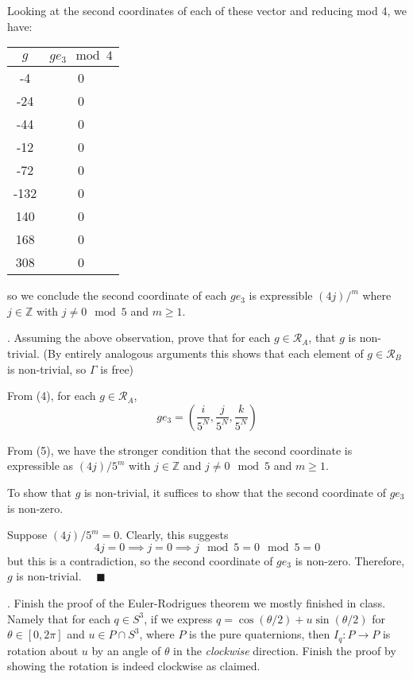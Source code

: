 \documentclass[12pt]{article}
\newcommand{\Z}{\mathbb{Z}}
\newcommand{\lra}{\longrightarrow}
\newcommand{\qed}{\quad \blacksquare}
\begin{document}
        Looking at the second coordinates of each of these vector and reducing mod 4, we have:
        \begin{center}
            \begin{tabular}{|c|c|}
                \hline 
                $g$ & $g e_3 \mod 4$\\
                \hline
                -4 & 0\\ 
                -24 & 0\\ 
                -44 & 0\\
                -12 & 0\\
                -72 & 0\\
                -132 & 0\\
                140 & 0\\
                168 & 0\\
                308 & 0\\ 
                \hline
            \end{tabular}
        \end{center}
        so we conclude the second coordinate of each $ge_3$ is expressible $(4j)/^m$ where $j \in \Z$ with $j \neq 0 \mod 5$ and $m \geq 1$.

    \color{black}


.  Assuming the above observation, prove that for each $g \in \mathcal{R}_{A}$, that $g$ is non-trivial.  (By entirely analogous arguments this shows that each element of $g \in \mathcal{R}_{B}$ is non-trivial, so $\Gamma$ is free)

    \color{blue}
        From (4), for each $g \in \mathcal{R}_A$, 
        \[ge_3 = \left(\frac{i}{5^N}, \frac{j}{5^N}, \frac{k}{5^N}\right)\]

        From (5), we have the stronger condition that the second coordinate is expressible as $(4j)/5^m$ with $j \in \Z$ and $j \neq 0 \mod 5$ and $m \geq 1$.

        To show that $g$ is non-trivial, it suffices to show that the second coordinate of $ge_3$ is non-zero.

        Suppose $(4j)/5^m = 0$. Clearly, this suggests 
        \[4j = 0 \implies j = 0 \implies j \mod 5 = 0 \mod 5 = 0\] 
        but this is a contradiction, so the second coordinate of $ge_3$ is non-zero. Therefore, $g$ is non-trivial. $\qed$
    \color{black}


.  Finish the proof of the Euler-Rodrigues theorem we mostly finished in class. Namely that for each $q \in S^{3}$, if we express $q = \cos(\theta/2) + u\sin(\theta/2)$ for $\theta \in [0,2\pi]$ and $u \in P\cap S^{3}$, where $P$ is the pure quaternions, then $I_{q} : P \lra P$ is rotation about $u$ by an angle of $\theta$ in the \emph{clockwise} direction.  Finish the proof by showing the rotation is indeed clockwise as claimed.
\end{document}

